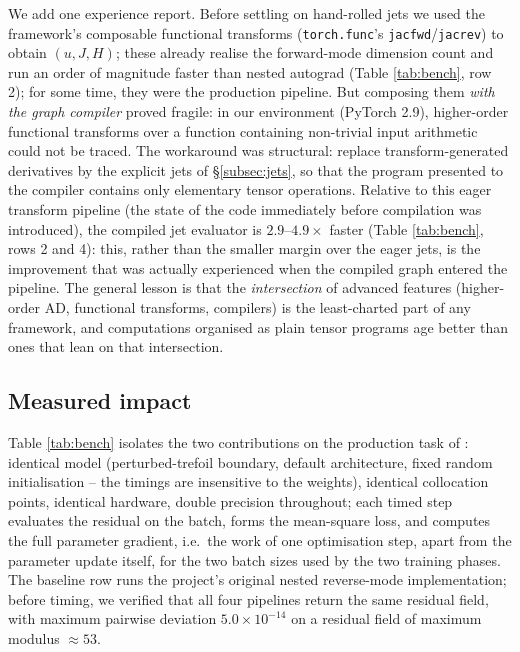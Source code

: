 \documentclass[oneside,british]{amsart}
\numberwithin{equation}{section}
\numberwithin{figure}{section}
\theoremstyle{plain}
\numberwithin{thm}{section}
\theoremstyle{plain}
\theoremstyle{plain}
\theoremstyle{definition}
\theoremstyle{remark}
\begin{document}
We add one experience report. Before settling on hand-rolled jets we
used the framework's composable functional transforms
(\texttt{torch.func}'s \texttt{jacfwd}/\texttt{jacrev}) to obtain
$(u,J,H)$; these already realise the forward-mode dimension count and
run an order of magnitude faster than nested autograd (Table
\ref{tab:bench}, row 2); for some time, they were the production
pipeline. But composing them \emph{with the graph compiler} proved
fragile: in our environment (PyTorch 2.9), higher-order functional
transforms over a function containing non-trivial input arithmetic
could not be traced. The workaround was structural: replace
transform-generated derivatives by the explicit jets of
\S\ref{subsec:jets}, so that the program presented to the compiler
contains only elementary tensor operations. Relative to this eager
transform pipeline (the state of the code immediately before
compilation was introduced), the compiled jet evaluator is
$2.9$--$4.9\times$ faster (Table \ref{tab:bench}, rows 2 and 4): this,
rather than the smaller margin over the eager jets, is the improvement
that was actually experienced when the compiled graph entered the
pipeline. The general lesson is that the \emph{intersection} of
advanced features (higher-order AD, functional transforms, compilers)
is the least-charted part of any framework, and computations organised
as plain tensor programs age better than ones that lean on that
intersection.

\subsection{Measured impact}\label{subsec:measured}

Table \ref{tab:bench} isolates the two contributions on the production
task of \cite{SchettiniUsula2026}: identical model (perturbed-trefoil
boundary, default architecture, fixed random initialisation -- the
timings are insensitive to the weights), identical collocation points,
identical hardware, double precision throughout; each timed step
evaluates the residual on the batch, forms the mean-square loss, and
computes the full parameter gradient, i.e.~the work of one optimisation
step, apart from the parameter update itself, for the two batch sizes
used by the two training phases. The baseline row runs the project's
original nested reverse-mode implementation; before timing, we
verified that all four pipelines return the same residual field, with
maximum pairwise deviation $5.0\times10^{-14}$ on a residual field of
maximum modulus $\approx53$.
\end{document}
